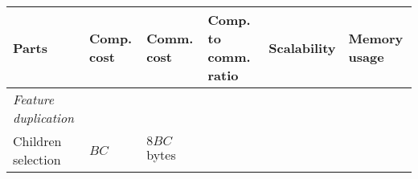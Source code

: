 \documentclass[10pt,oneside]{memoir}
\begin{document}
\begin{longtable}[]{@{}llllll@{}}
\toprule
\begin{minipage}[b]{0.19\columnwidth}\raggedright
Parts\strut
\end{minipage} & \begin{minipage}[b]{0.10\columnwidth}\raggedright
Comp. cost\strut
\end{minipage} & \begin{minipage}[b]{0.13\columnwidth}\raggedright
Comm. cost\strut
\end{minipage} & \begin{minipage}[b]{0.19\columnwidth}\raggedright
Comp. to comm. ratio\strut
\end{minipage} & \begin{minipage}[b]{0.11\columnwidth}\raggedright
Scalability\strut
\end{minipage} & \begin{minipage}[b]{0.12\columnwidth}\raggedright
Memory usage\strut
\end{minipage}\tabularnewline
\midrule
\endhead
\begin{minipage}[t]{0.19\columnwidth}\raggedright
\emph{Feature duplication}\strut
\end{minipage} & \begin{minipage}[t]{0.10\columnwidth}\raggedright
\strut
\end{minipage} & \begin{minipage}[t]{0.13\columnwidth}\raggedright
\strut
\end{minipage} & \begin{minipage}[t]{0.19\columnwidth}\raggedright
\strut
\end{minipage} & \begin{minipage}[t]{0.11\columnwidth}\raggedright
\strut
\end{minipage} & \begin{minipage}[t]{0.12\columnwidth}\raggedright
\strut
\end{minipage}\tabularnewline
\begin{minipage}[t]{0.19\columnwidth}\raggedright
Children selection\strut
\end{minipage} & \begin{minipage}[t]{0.10\columnwidth}\raggedright
\(BC\)\strut
\end{minipage} & \begin{minipage}[t]{0.13\columnwidth}\raggedright
\(8BC\) bytes\strut
\end{minipage} & \begin{minipage}[t]{0.19\columnwidth}\raggedright

\end{minipage}
\end{longtable}
\end{document}
